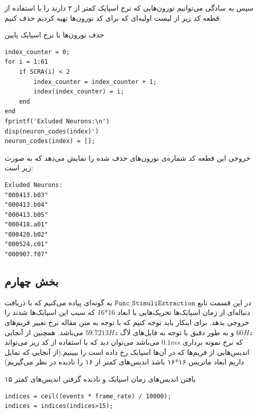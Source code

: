 \documentclass[12pt,onecolumn,a4paper,fleqn]{article}
\newcommand{\pf}[1]{$\mathtt{#1}$}
\begin{document}
سپس به سادگی می‌توانیم نورون‌هایی که نرخ اسپایک کمتر از ۲ دارند را با استفاده از قطعه کد زیر از لیست اولیه‌ای که برای کد نورون‌ها تهیه کردیم حذف کنیم.

\begin{code}{حذف نورون‌ها با نرخ اسپایک پایین}
	\begin{latin}
		\begin{lstlisting}[style=Matlab-editor, tabsize=2]
index_counter = 0;
for i = 1:61
	if SCRA(i) < 2
		index_counter = index_counter + 1;
		index(index_counter) = i;
	end
end
fprintf('Exluded Neurons:\n')
disp(neuron_codes(index)')
neuron_codes(index) = [];
		\end{lstlisting}
	\end{latin}
\end{code}


خروجی این قطعه کد شماره‌ی نورون‌های حذف شده را نمایش می‌دهد که به صورت زیر است:
\begin{latin}
	\begin{lstlisting}[basicstyle=\small, frame = single]
Exluded Neurons:
"000413.b03"
"000413.b04"
"000413.b05"
"000418.a01"
"000420.b02"
"000524.c01"
"000907.f07"
	\end{lstlisting}
\end{latin}

\subsection{بخش چهارم}
		در این قسمت تابع \pf{Func\_StimuliExtraction} به گونه‌ای پیاده می‌کنیم که با دریافت دنباله‌ای از زمان اسپایک‌ها تحریک‌هایی با ابعاد 16*16 که سبب این اسپایک‌ها شدند را خروجی بدهد. برای اینکار باید توجه کنیم که با توجه به متن مقاله نرخ تغییر فریم‌های $60Hz$ و به طور دقیق با توجه به فایل‌های لاگ
		 $59.7213Hz$
		 می‌باشد. همچنین از آنجایی که نرخ نمونه برداری $0.1ms$ می‌باشد می‌توان دید که با استفاده از کد زیر می‌تواند اندیس‌هایی از فریم‌ها که در آن‌ها اسپایک رخ‌ داده است را ببینیم.(از آنجایی که تمایل داریم ابعاد ماتریس ۱۶*۱۶ باشد اندیس‌های کمتر از ۱۶ را نادیده در نظر می‌گیریم)

\begin{code}{یافتن اندیس‌های زمان اسپایک و نادیده گرفتن اندیس‌های کمتر ۱۵}
	\begin{latin}
		\begin{lstlisting}[style=Matlab-editor, tabsize=2]
indices = ceil((events * frame_rate) / 10000);
indices = indices(indices>15);
		\end{lstlisting}
	\end{latin}
\end{code}
 
\end{document}
